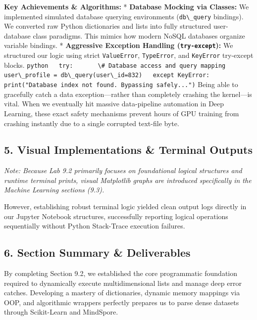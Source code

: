 \textbf{Key Achievements \& Algorithms:} * \textbf{Database Mocking via
Classes:} We implemented simulated database querying environments
(\passthrough{\lstinline!db\_query!} bindings). We converted raw Python
dictionaries and lists into fully structured user-database class
paradigms. This mimics how modern NoSQL databases organize variable
bindings. * \textbf{Aggressive Exception Handling
(\passthrough{\lstinline!try-except!}):} We structured our logic using
strict \passthrough{\lstinline!ValueError!},
\passthrough{\lstinline!TypeError!}, and
\passthrough{\lstinline!KeyError!} try-except blocks.
\passthrough{\lstinline!python   try:       \# Database access and query mapping       user\_profile = db\_query(user\_id=832)   except KeyError:       print("Database index not found. Bypassing safely...")!}
Being able to gracefully catch a data exception---rather than completely
crashing the kernel---is vital. When we eventually hit massive
data-pipeline automation in Deep Learning, these exact safety mechanisms
prevent hours of GPU training from crashing instantly due to a single
corrupted text-file byte.

\hypertarget{visual-implementations-terminal-outputs}{%
\subsection{5. Visual Implementations \& Terminal
Outputs}\label{visual-implementations-terminal-outputs}}

\emph{Note: Because Lab 9.2 primarily focuses on foundational logical
structures and runtime terminal prints, visual Matplotlib graphs are
introduced specifically in the Machine Learning sections (9.3).}

However, establishing robust terminal logic yielded clean output logs
directly in our Jupyter Notebook structures, successfully reporting
logical operations sequentially without Python Stack-Trace execution
failures.

\hypertarget{section-summary-deliverables}{%
\subsection{6. Section Summary \&
Deliverables}\label{section-summary-deliverables}}

By completing Section 9.2, we established the core programmatic
foundation required to dynamically execute multidimensional lists and
manage deep error catches. Developing a mastery of dictionaries, dynamic
memory mappings via OOP, and algorithmic wrappers perfectly prepares us
to parse dense datasets through Scikit-Learn and MindSpore.
